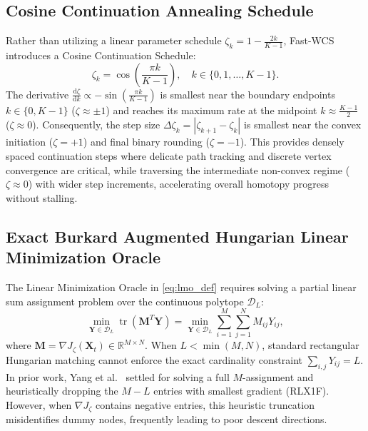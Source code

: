 \documentclass[conference]{IEEEtran}
\begin{document}
\subsection{Cosine Continuation Annealing Schedule}

Rather than utilizing a linear parameter schedule $\zeta_k = 1 - \frac{2k}{K - 1}$, Fast-WCS introduces a Cosine Continuation Schedule:
\begin{equation}
\zeta_k = \cos\!\left(\frac{\pi k}{K - 1}\right), \quad k \in \{0, 1, \ldots, K - 1\}.
\label{eq:cosine_schedule}
\end{equation}
The derivative $\frac{\mathrm{d}\zeta}{\mathrm{d}k} \propto -\sin(\frac{\pi k}{K-1})$ is smallest near the boundary endpoints $k \in \{0, K-1\}$ ($\zeta \approx \pm 1$) and reaches its maximum rate at the midpoint $k \approx \frac{K-1}{2}$ ($\zeta \approx 0$). Consequently, the step size $\Delta \zeta_k = |\zeta_{k+1} - \zeta_k|$ is smallest near the convex initiation ($\zeta = +1$) and final binary rounding ($\zeta = -1$). This provides densely spaced continuation steps where delicate path tracking and discrete vertex convergence are critical, while traversing the intermediate non-convex regime ($\zeta \approx 0$) with wider step increments, accelerating overall homotopy progress without stalling.

\subsection{Exact Burkard Augmented Hungarian Linear Minimization Oracle}
\label{subsec:burkard}

The Linear Minimization Oracle in \eqref{eq:lmo_def} requires solving a partial linear sum assignment problem over the continuous polytope $\mathcal{D}_L$:
\begin{equation}
\min_{\mathbf{Y} \in \mathcal{D}_L} \operatorname{tr}(\mathbf{M}^T \mathbf{Y}) = \min_{\mathbf{Y} \in \mathcal{D}_L} \sum_{i=1}^M \sum_{j=1}^N M_{ij} Y_{ij},
\label{eq:lmo_problem}
\end{equation}
where $\mathbf{M} = \nabla J_\zeta(\mathbf{X}_t) \in \mathbb{R}^{M \times N}$. When $L < \min(M, N)$, standard rectangular Hungarian matching cannot enforce the exact cardinality constraint $\sum_{i, j} Y_{ij} = L$. In prior work, Yang et al.~\cite{yang2018algorithm} settled for solving a full $M$-assignment and heuristically dropping the $M - L$ entries with smallest gradient (RLX1F). However, when $\nabla J_\zeta$ contains negative entries, this heuristic truncation misidentifies dummy nodes, frequently leading to poor descent directions.
\end{document}

